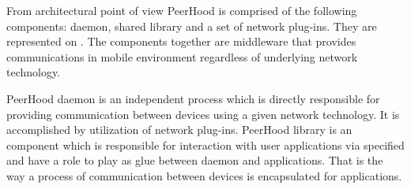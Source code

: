 %
From architectural point of view PeerHood is comprised of the following components: daemon, shared library and a set of network plug-ins. 
%
They are represented on . 
%
The components together are  middleware that provides communications in mobile  environment regardless of underlying network technology. 


%
PeerHood daemon is an independent process which is directly responsible for providing communication between devices using a given network technology. 
%
It is accomplished by utilization of network plug-ins. 
%
PeerHood library is an component which is responsible for interaction with user applications via specified  and have a role to play as glue between daemon and applications. 
%
That is the way a process of communication between devices is encapsulated for applications. 








